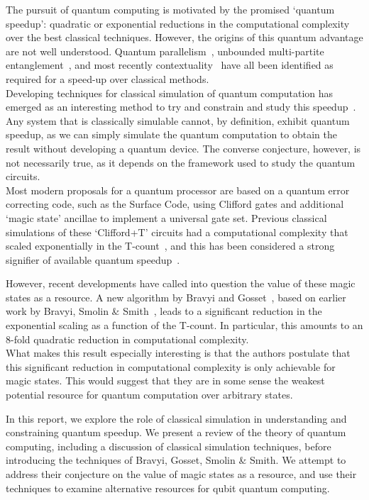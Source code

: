 \documentclass{standalone}
\begin{document}
The pursuit of quantum computing is motivated by the promised `quantum speedup': quadratic or exponential reductions in the computational complexity over the best classical techniques. However, the origins of this quantum advantage are not well understood. Quantum parallelism~\cite{Deutsch1985}, unbounded multi-partite entanglement~\cite{Jozsa2003}, and most recently contextuality~\cite{Howard2014} have all been identified as required for a speed-up over classical methods. \\
Developing techniques for classical simulation of quantum computation has emerged as an interesting method to try and constrain and study this speedup~\cite{Jozsa2003}. Any system that is classically simulable cannot, by definition, exhibit quantum speedup, as we can simply simulate the quantum computation to obtain the result without developing a quantum device. The converse conjecture, however, is not necessarily true, as it depends on the framework used to study the quantum circuits.  \\
Most modern proposals for a quantum processor are based on a quantum error correcting code, such as the Surface Code, using Clifford gates and additional `magic state' ancillae to implement a universal gate set. Previous classical simulations of these `Clifford+T' circuits had a computational complexity that scaled exponentially in the T-count~\cite{Aaronson2004a}, and this has been considered a strong signifier of available quantum speedup~\cite{Jozsa2003}.
\par
However, recent developments have called into question the value of these magic states as a resource. A new algorithm by Bravyi and Gosset~\cite{Bravyi2016b}, based on earlier work by Bravyi, Smolin \& Smith~\cite{Bravyi2015}, leads to a significant reduction in the exponential scaling as a function of the T-count. In particular, this amounts to an 8-fold quadratic reduction in computational complexity. \\
What makes this result especially interesting is that the authors postulate that this significant reduction in computational complexity is only achievable for magic states.  This would suggest that they are in some sense the weakest potential resource for quantum computation over arbitrary states. 
\par
In this report, we explore the role of classical simulation in understanding and constraining quantum speedup. We present a review of the theory of quantum computing, including a discussion of classical simulation techniques, before introducing the techniques of Bravyi, Gosset, Smolin \& Smith. We attempt to address their conjecture on the value of magic states as a resource, and use their techniques to examine alternative resources for qubit quantum computing. 
\ifstandalone

\fi
\end{document}
